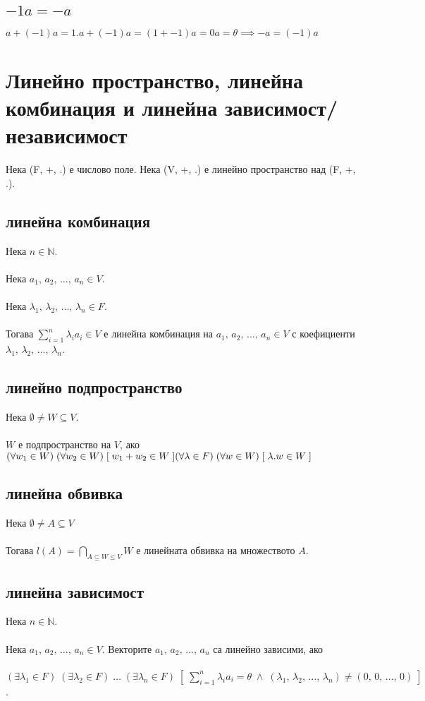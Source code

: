 \documentclass[12pt]{article}
\begin{document}
    \subsection{\(-1a = -a\)}
    \(a + (-1)a = 1.a + (-1)a = (1 + -1)a = 0a = \theta \implies -a = (-1)a\)
    \section{Линейно пространство, линейна комбинация и линейна зависимост/независимост}
    Нека (F, +, .) е числово поле. Нека (V, +, .) е линейно пространство над (F, +, .).
    \subsection{линейна комбинация}
    Нека \(n \in \mathbb{N}\).\\\\
    Нека \(a_1, \, a_2, \, \dots, \, a_n \in V\). \\\\
    Нека \(\lambda_1, \, \lambda_2, \, \dots, \, \lambda_n \in F\).\\\\
    Тогава \(\displaystyle\sum_{i=1}^{n} \lambda_i a_i \in V\) е линейна комбинация
    на  \(a_1, \, a_2, \, \dots, \, a_n \in V\)
    с коефициенти \(\lambda_1, \, \lambda_2, \, \dots, \, \lambda_n\).
    \subsection{линейно подпространство}
    Нека \(\emptyset \neq W \subseteq V\).\\\\
    \(W\) е подпространство на \(V\), ако
    \((\forall w_1 \in W) \; (\forall w_2 \in W) \; [\; w_1 + w_2 \in W  \;]\\\\
    (\forall \lambda \in F) \; (\forall w \in W) \; [\; \lambda . w \in W  \;]\)
    \subsection{линейна обвивка}
    Нека \(\emptyset \neq A \subseteq V\)\\\\
    Тогава \(l(A) = \displaystyle\bigcap_{A \subseteq W \leq V} W\) е линейната обвивка на множеството \(A\).
    \subsection{линейна зависимост}
    Нека \(n \in \mathbb{N}\).\\\\
    Нека \(a_1, \, a_2, \, \dots, \, a_n \in V\). Векторите \(a_1, \, a_2, \, \dots, \, a_n\)  са линейно зависими, ако \\\\
    \((\exists \lambda_1 \in F) \; (\exists \lambda_2 \in F) \; \dots \; (\exists \lambda_n \in F) \; \left[\; \displaystyle\sum_{i=1}^{n} \lambda_i a_i = \theta \; \land \; (\lambda_1, \, \lambda_2, \, \dots, \, \lambda_n) \neq (0, \, 0, \, \dots, \, 0) \; \right ]\).
\end{document}
